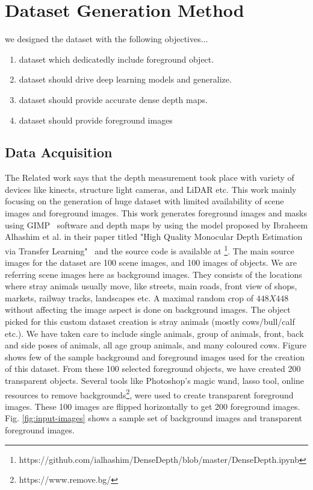 \documentclass{article}
\begin{document}
\section{Dataset Generation Method}
we designed the dataset with the following objectives...
\begin{enumerate}
\item dataset which dedicatedly include foreground object. 
\item dataset should drive deep learning models and generalize. 
\item dataset should provide accurate dense depth maps.
\item dataset should provide foreground images
\end{enumerate}

\subsection{Data Acquisition}
The Related work says that the depth measurement took place with variety of devices like kinects, structure light cameras, and LiDAR etc. 
This work mainly focusing on the generation of huge dataset with limited availability of scene images and foreground images. 
This work generates foreground images and masks using GIMP~\cite{howat2014greenland} software and 
depth maps by using the model proposed by Ibraheem Alhashim et al. in their paper titled "High Quality Monocular Depth Estimation 
via Transfer Learning"~\cite{alhashim2018high} and the source code is available 
at \footnote{https://github.com/ialhashim/DenseDepth/blob/master/DenseDepth.ipynb}. 
The main source images for the dataset are 100 scene images, and 100 images of objects. 
We are referring scene images here as background images. 
They consists of the locations where stray animals usually move, like streets, main roads, front view of shops, markets, 
railway tracks, landscapes etc. A maximal random crop of $448 X 448$ without affecting the image aspect is done on 
background images. The object picked for this custom dataset creation is stray animals (mostly cows/bull/calf etc.). 
We have taken care to include single animals, group of animals, front, back and side poses of animals, 
all age group animals, and many coloured cows. 
Figure shows few of the sample background and foreground images used for the creation of this dataset. 
From these 100 selected foreground objects, we have created 200 transparent objects. 
Several tools like Photoshop's magic wand, lasso tool, 
online resources to remove backgrounds\footnote{https://www.remove.bg/}, 
were used to create transparent foreground images. These 100 images are flipped horizontally to get 200 
foreground images. Fig. \ref{fig:input-images} shows a sample set of background images and transparent foreground images.
\end{document}
